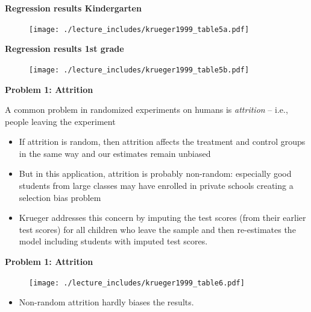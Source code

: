 \documentclass{beamer}
\begin{document}
\begin{frame}[plain]
	\begin{center}
	\textbf{Regression results Kindergarten}
	\end{center}
	
	\begin{figure}
	\texttt{[image: ./lecture\_includes/krueger1999\_table5a.pdf]}
	\end{figure}
\end{frame}


\begin{frame}[plain]
	\begin{center}
	\textbf{Regression results 1st grade}
	\end{center}
	
	\begin{figure}
	\texttt{[image: ./lecture\_includes/krueger1999\_table5b.pdf]}
	\end{figure}
\end{frame}

\begin{frame}[plain]
	\begin{center}
	\textbf{Problem 1: Attrition}
	\end{center}
	
A common problem in randomized experiments on humans is \emph{attrition} -- i.e., people leaving the experiment
	\begin{itemize}		
	\item If attrition is random, then attrition affects the treatment and control groups in the same way and our estimates remain unbiased
	\item But in this application, attrition is probably non-random: especially good students from large classes may have enrolled in private schools creating a selection bias problem
	\item Krueger addresses this concern by imputing the test scores (from their earlier test scores) for all children who leave the sample and then re-estimates the model including students with imputed test scores.
	\end{itemize}
\end{frame}

\begin{frame}[plain, shrink=20]
	\begin{center}
	\textbf{Problem 1: Attrition}
	\end{center}
	
	\begin{figure}
	\texttt{[image: ./lecture\_includes/krueger1999\_table6.pdf]}
	\end{figure}
	
	\begin{itemize}
	\item Non-random attrition hardly biases the results.
	\end{itemize}
\end{frame}
\end{document}
